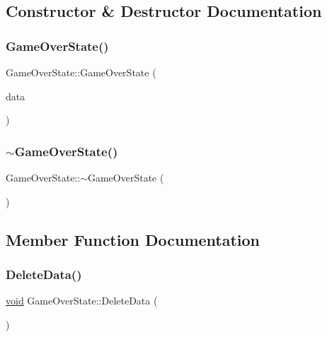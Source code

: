 \subsection{Constructor \& Destructor Documentation}
\mbox{\label{classGameOverState_aa96fa2d6ec8131c6295ef8ae189b5dc1}} 
\subsubsection{\texorpdfstring{Game\+Over\+State()}{GameOverState()}}
{\footnotesize\ttfamily Game\+Over\+State\+::\+Game\+Over\+State (\begin{DoxyParamCaption}\item[{\hyperlink{structGameData}{Game\+Data} \&}]{data }\end{DoxyParamCaption})}

\mbox{\label{classGameOverState_a6450295ac3a2d64a19bdfe1ad70aacad}} 
\subsubsection{\texorpdfstring{$\sim$\+Game\+Over\+State()}{~GameOverState()}}
{\footnotesize\ttfamily Game\+Over\+State\+::$\sim$\+Game\+Over\+State (\begin{DoxyParamCaption}{ }\end{DoxyParamCaption})}



\subsection{Member Function Documentation}
\mbox{\label{classGameOverState_afb6fa68ff0c5e4f83725de8059c4f7c8}} 
\subsubsection{\texorpdfstring{Delete\+Data()}{DeleteData()}}
{\footnotesize\ttfamily \hyperlink{imgui__impl__opengl3__loader_8h_ac668e7cffd9e2e9cfee428b9b2f34fa7}{void} Game\+Over\+State\+::\+Delete\+Data (\begin{DoxyParamCaption}{ }\end{DoxyParamCaption})\hspace{0.3cm}{\ttfamily [virtual]}}



